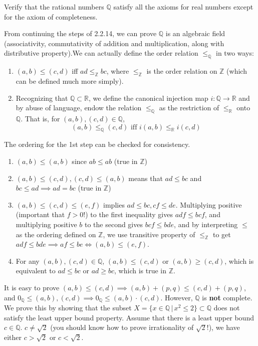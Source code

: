 \documentclass{article}
\begin{document}
    \begin{exercise}[Zorich 2.2.13]
    Verify that the rational numbers $\mathbb{Q}$ satisfy all the axioms for real numbers except for the axiom of completeness. 
    \end{exercise}

    \begin{solution}
    From continuing the steps of 2.2.14, we can prove $\mathbb{Q}$ is an algebraic field (associativity, commutativity of addition and multiplication, along with distributive property).We can actually define the order relation $\leq_\mathbb{Q}$ in two ways: 
    \begin{enumerate}
        \item $(a, b) \leq (c, d)$ iff $ad \leq_{\mathbb{Z}} bc$, where $\leq_{\mathbb{Z}}$ is the order relation on $\mathbb{Z}$ (which can be defined much more simply). 
        \item Recognizing that $\mathbb{Q} \subset \mathbb{R}$, we define the canonical injection map $i: \mathbb{Q} \longrightarrow \mathbb{R}$ and by abuse of language, endow the relation $\leq_{\mathbb{Q}}$ as the restriction of $\leq_{\mathbb{R}}$ onto $\mathbb{Q}$. That is, for $(a, b), (c, d) \in \mathbb{Q}$, 
        \[(a, b) \leq_{\mathbb{Q}} (c, d) \text{ iff } i(a, b) \leq_{\mathbb{R}} i(c, d)\]
    \end{enumerate}
    The ordering for the 1st step can be checked for consistency. 
    \begin{enumerate}
        \item $(a, b) \leq (a, b)$ since $ab \leq ab$ (true in $\mathbb{Z}$) 
        \item $(a, b) \leq (c, d), (c, d) \leq (a, b)$ means that $ad \leq bc$ and $bc \leq ad \implies ad = bc$ (true in $\mathbb{Z}$) 
        \item $(a, b) \leq (c, d) \leq (e, f)$ implies $ad \leq bc, cf \leq de$. Multiplying positive (important that $f >0$!) to the first inequality gives $adf \leq bcf$, and multiplying positive $b$ to the second gives $bcf \leq bde$, and by interpreting $\leq$ as the ordering defined on $\mathbb{Z}$, we use transitive property of $\leq_\mathbb{Z}$ to get $adf \leq bde \implies af \leq be \iff (a, b) \leq (e, f)$. 
        \item For any $(a, b), (c, d) \in \mathbb{Q}$, $(a, b) \leq (c, d)$ or $(a, b) \geq (c, d)$, which is equivalent to $ad \leq bc$ or $ad \geq bc$, which is true in $\mathbb{Z}$. 
    \end{enumerate}
    It is easy to prove $(a, b) \leq (c, d) \implies (a, b) + (p, q) \leq (c, d) + (p, q)$, and $0_{\mathbb{Q}} \leq (a, b), (c, d) \implies 0_\mathbb{Q} \leq (a, b) \cdot (c, d)$. However, $\mathbb{Q}$ is \textbf{not} complete. We prove this by showing that the subset $X = \{x \in \mathbb{Q} \,|\,x^2 \leq 2 \} \subset \mathbb{Q}$ does not satisfy the least upper bound property. Assume that there is a least upper bound $c \in \mathbb{Q}$. $c \neq \sqrt{2}$ (you should know how to prove irrationality of $\sqrt{2}$!), we have either $c > \sqrt{2}$ or $c < \sqrt{2}$. 

\end{solution}
\end{document}

